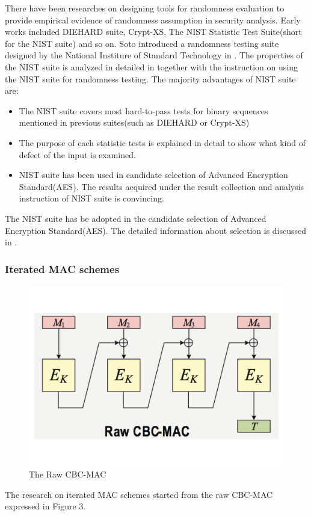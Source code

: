 \documentclass{article}
\begin{document}
There have been researches on designing tools for randomness evaluation to provide empirical evidence of randomness assumption in security analysis.
Early works included DIEHARD suite, Crypt-XS, The NIST
Statistic Test Suite(short for the NIST suite) and so on. Soto introduced a randomness testing suite designed by the National Institure of Standard Technology in \cite{Soto1999}. The properties of the NIST suite is analyzed in detailed in \cite{NIST_suite} together with the instruction on using the NIST suite for randomness testing.
The majority advantages of NIST suite are:
\begin{itemize}
	\item The NIST suite covers most hard-to-pass tests for binary sequences
	mentioned in previous suites(such as DIEHARD or Crypt-XS)
	\item The purpose of each statistic tests is explained in detail to show
	what kind of defect of the input is examined.
	\item NIST suite has been used in candidate selection of Advanced Encryption
	Standard(AES). The results acquired under the result collection and analysis instruction of NIST suite is
	convincing.
\end{itemize}
The NIST suite has be adopted in the candidate selection of Advanced Encryption Standard(AES). The detailed information about selection is discussed in \cite{candidate_test,final_test}. 
\subsubsection{Iterated MAC schemes}
\begin{figure}[htbp]
\centering
\includegraphics[scale=0.3]{./diagram/cbc-mac.pdf}
\caption{The Raw CBC-MAC}
\label{fig:3 }
\end{figure}
The research on iterated MAC schemes started from the raw CBC-MAC expressed in Figure 3.
\end{document}
